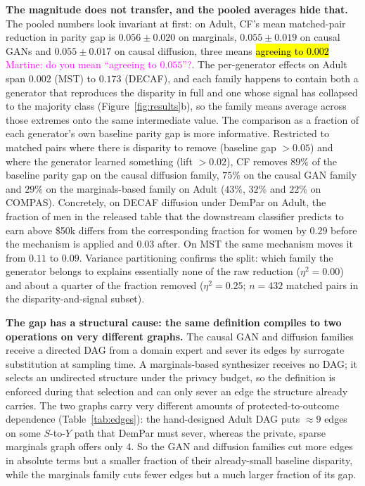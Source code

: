 \documentclass{article}
\newcommand{\martine}[1]{\textcolor{magenta}{Martine: #1}}
\begin{document}
\textbf{The magnitude does not transfer, and the pooled averages hide that.}
The pooled numbers look invariant at first: on Adult, CF's mean matched-pair
reduction in parity gap is $0.056 \pm 0.020$ on marginals, $0.055 \pm 0.019$
on causal GANs and $0.055 \pm 0.017$ on causal diffusion, three means
\hl{agreeing to $0.002$} \martine{do you mean ``agreeing to $0.055$''?}. The per-generator effects on Adult span $0.002$ (MST)
to $0.173$ (DECAF), and each family happens to contain both a generator
that reproduces the disparity in full and one whose signal has collapsed to
the majority class (Figure~\ref{fig:results}b), so the family means average
across those extremes onto the same intermediate value. The comparison as a fraction of
each generator's own baseline parity gap is more informative. Restricted to
matched pairs where there is disparity to remove (baseline gap $>0.05$) and
where the generator learned something (lift $>0.02$), CF removes $89\%$ of
the baseline parity gap on the causal diffusion family, $75\%$ on the causal
GAN family and $29\%$ on the marginals-based family on Adult ($43\%$, $32\%$
and $22\%$ on COMPAS). Concretely, on DECAF
diffusion under DemPar on Adult, the fraction of men in the released table
that the downstream classifier predicts to earn above \$50k differs from the
corresponding fraction for women by $0.29$ before the mechanism is applied
and $0.03$ after. On MST the same mechanism moves it from $0.11$ to $0.09$.
Variance partitioning confirms the split: which family the generator belongs
to explains essentially none of the raw reduction ($\eta^2 = 0.00$) and
about a quarter of the fraction removed ($\eta^2 = 0.25$; $n = 432$ matched
pairs in the disparity-and-signal subset).

\textbf{The gap has a structural cause: the same definition compiles to two
operations on very different graphs.} The causal GAN and diffusion families
receive a directed DAG from a domain expert and sever its edges by surrogate
substitution at sampling time. A marginals-based synthesizer receives no DAG;
it selects an undirected structure under the privacy budget, so the definition
is enforced during that selection and can only sever an edge the structure
already carries. The two graphs carry very different amounts of
protected-to-outcome dependence (Table~\ref{tab:edges}): the hand-designed
Adult DAG puts $\approx 9$ edges on some $S$-to-$Y$ path that DemPar must
sever, whereas the private, sparse marginals graph offers only $4$. So the GAN
and diffusion families cut more edges in absolute terms but a smaller fraction
of their already-small baseline disparity, while the marginals family cuts
fewer edges but a much larger fraction of its gap.
\end{document}
